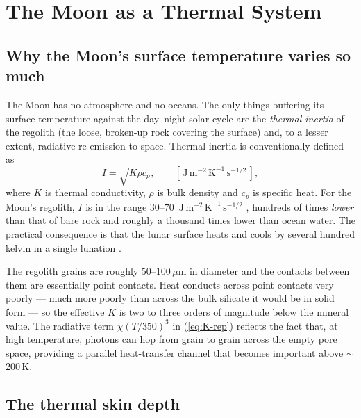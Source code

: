 \documentclass[11pt]{report}
\begin{document}
\chapter{The Moon as a Thermal System}\label{ch:moon}

\section{Why the Moon's surface temperature varies so much}

The Moon has no atmosphere and no oceans. The only things buffering
its surface temperature against the day--night solar cycle are the
\emph{thermal inertia} of the regolith (the loose, broken-up rock
covering the surface) and, to a lesser extent, radiative re-emission
to space. Thermal inertia is conventionally defined as
\begin{equation}
I = \sqrt{K \rho c_p},\qquad
[\,\mathrm{J\,m^{-2}\,K^{-1}\,s^{-1/2}}\,],
\label{eq:inertia}
\end{equation}
where $K$ is thermal conductivity, $\rho$ is bulk density and $c_p$
is specific heat. For the Moon's regolith, $I$ is in the range
$30$--$70$~$\mathrm{J\,m^{-2}\,K^{-1}\,s^{-1/2}}$
\citep{vasavada2012}, hundreds of times \emph{lower} than that of bare
rock and roughly a thousand times lower than ocean water. The
practical consequence is that the lunar surface heats and cools by
several hundred kelvin in a single lunation
\citep[$\sim$\SI{29.53}{\day};][]{paige2010}.

\begin{aside}
The regolith grains are roughly $50\text{--}100\,\mu$m in diameter and
the contacts between them are essentially point contacts. Heat conducts
across point contacts very poorly --- much more poorly than across the
bulk silicate it would be in solid form --- so the effective
$K$ is two to three orders of magnitude below the mineral value.
The radiative term $\chi(T/350)^3$ in (\ref{eq:K-rep}) reflects the
fact that, at high temperature, photons can hop from grain to grain
across the empty pore space, providing a parallel heat-transfer
channel that becomes important above $\sim$200\,\si{\kelvin}.
\end{aside}

\section{The thermal skin depth}
\end{document}
